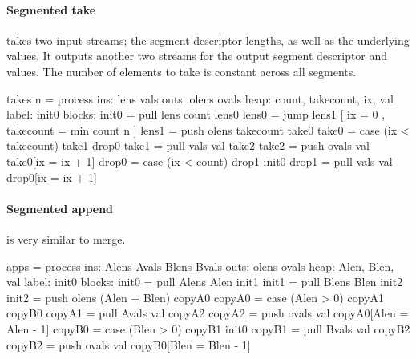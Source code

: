 \paragraph{Segmented take}
takes two input streams; the segment descriptor lengths, as well as the underlying values.
It outputs another two streams for the output segment descriptor and values.
The number of elements to take is constant across all segments.

\begin{code}
takes n = process
     ins: lens vals
    outs: olens ovals
    heap: {count, takecount, ix, val}
   label: init0
  blocks: init0 = pull lens count lens0
          lens0 = jump lens1
                [ ix = 0
                , takecount = min count n ]
          lens1 = push olens takecount take0
          take0 = case (ix < takecount) take1 drop0
          take1 = pull vals val take2
          take2 = push ovals val take0[ix = ix + 1]
          drop0 = case (ix < count) drop1 init0
          drop1 = pull vals val drop0[ix = ix + 1]
\end{code}

\paragraph{Segmented append} is very similar to merge.

\begin{code}
apps = process
     ins: Alens Avals Blens Bvals
    outs: olens ovals
    heap: {Alen, Blen, val}
   label: init0
  blocks: init0 = pull Alens Alen init1
          init1 = pull Blens Blen init2
          init2 = push olens  (Alen + Blen) copyA0
          copyA0 = case (Alen > 0) copyA1 copyB0
          copyA1 = pull Avals val copyA2
          copyA2 = push ovals val copyA0[Alen = Alen - 1]
          copyB0 = case (Blen > 0) copyB1 init0
          copyB1 = pull Bvals val copyB2
          copyB2 = push ovals val copyB0[Blen = Blen - 1]
\end{code}

